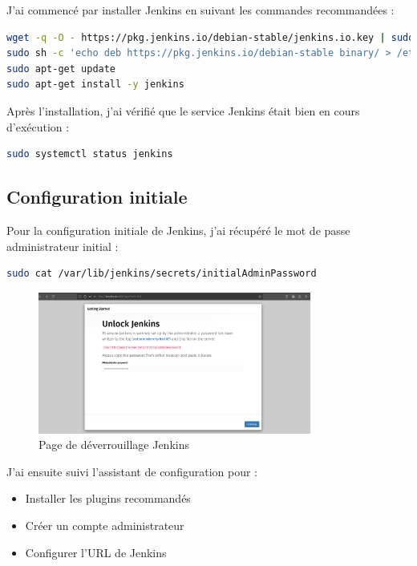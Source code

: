 \documentclass{article}
\begin{document}
J'ai commencé par installer Jenkins en suivant les commandes recommandées :

\begin{lstlisting}[language=bash]
wget -q -O - https://pkg.jenkins.io/debian-stable/jenkins.io.key | sudo apt-key add -
sudo sh -c 'echo deb https://pkg.jenkins.io/debian-stable binary/ > /etc/apt/sources.list.d/jenkins.list'
sudo apt-get update
sudo apt-get install -y jenkins
\end{lstlisting}

Après l'installation, j'ai vérifié que le service Jenkins était bien en cours d'exécution :

\begin{lstlisting}[language=bash]
sudo systemctl status jenkins
\end{lstlisting}

\subsection{Configuration initiale}
Pour la configuration initiale de Jenkins, j'ai récupéré le mot de passe administrateur initial :

\begin{lstlisting}[language=bash]
sudo cat /var/lib/jenkins/secrets/initialAdminPassword
\end{lstlisting}

\begin{figure}[h]
    \centering
    \includegraphics[width=0.8\textwidth]{images/jenkins_unlock.png}
    \caption{Page de déverrouillage Jenkins}
    \label{fig:jenkins_unlock}
\end{figure}

J'ai ensuite suivi l'assistant de configuration pour :
\begin{itemize}
    \item Installer les plugins recommandés
    \item Créer un compte administrateur
    \item Configurer l'URL de Jenkins
\end{itemize}
\end{document}
